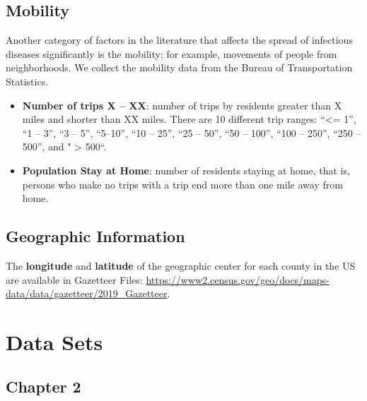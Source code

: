 \documentclass[]{book}
\begin{document}
\subsection{Mobility}\label{mobility}

Another category of factors in the literature that affects the spread of
infectious diseases significantly is the mobility; for example,
movements of people from neighborhoods. We collect the mobility data
from the Bureau of Transportation Statistics.

\begin{itemize}
\item
  \textbf{Number of trips X -- XX}: number of trips by residents greater
  than X miles and shorter than XX miles. There are 10 different trip
  ranges: ``\textless{}= 1'', ``1 -- 3'', ``3 -- 5'', ``5--10'', ``10 --
  25'', ``25 -- 50'', ``50 -- 100'', ``100 -- 250'', ``250 -- 500'', and
  " \textgreater{} 500``.
\item
  \textbf{Population Stay at Home}: number of residents staying at home,
  that is, persons who make no trips with a trip end more than one mile
  away from home.
\end{itemize}

\subsection{Geographic Information}\label{geographic-information}

The \textbf{longitude} and \textbf{latitude} of the geographic center
for each county in the US are available in Gazetteer Files:
\url{https://www2.census.gov/geo/docs/maps-data/data/gazetteer/2019_Gazetteer}.

\section{Data Sets}\label{data-sets}

\subsection{Chapter 2}\label{chapter-2}
\end{document}
